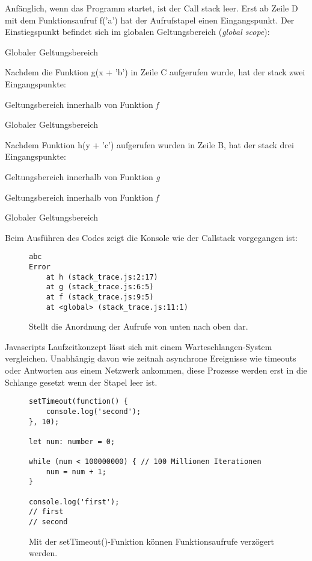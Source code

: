 \noindent
Anfänglich, wenn das Programm startet, ist der Call stack leer. Erst ab Zeile D mit dem Funktionsaufruf f('a') hat der Aufrufstapel einen Eingangspunkt. Der Einstiegspunkt befindet sich im globalen Geltungsbereich (\textit{global scope}):

\begin{description}
\item Globaler Geltungsbereich
\end{description}

\noindent
Nachdem die Funktion g(x + 'b') in Zeile C aufgerufen wurde, hat der stack zwei Eingangspunkte:

\begin{description}
\item Geltungsbereich innerhalb von Funktion \textit{f}
\item Globaler Geltungsbereich
\end{description}

\noindent
Nachdem Funktion h(y + 'c') aufgerufen wurden in Zeile B, hat der stack drei Eingangspunkte:

\begin{description}
\item Geltungsbereich innerhalb von Funktion \textit{g}
\item Geltungsbereich innerhalb von Funktion \textit{f}
\item Globaler Geltungsbereich
\end{description}

\noindent
Beim Ausführen des Codes zeigt die Konsole wie der Callstack vorgegangen ist:

\begin{figure}[H]
\begin{lstlisting}
abc
Error
    at h (stack_trace.js:2:17)
    at g (stack_trace.js:6:5)
    at f (stack_trace.js:9:5)
    at <global> (stack_trace.js:11:1)
\end{lstlisting}
\caption{Stellt die Anordnung der Aufrufe von unten nach oben dar.}
\label{stack-trace-error}
\end{figure}

\noindent
Javascripts Laufzeitkonzept lässt sich mit einem Warteschlangen-System vergleichen. Unabhängig davon wie zeitnah asynchrone Ereignisse wie timeouts oder Antworten aus einem Netzwerk ankommen, diese Prozesse werden erst in die Schlange gesetzt wenn der Stapel leer ist.

\begin{figure}[H]
\begin{lstlisting}[basicstyle=\small]
setTimeout(function() {
    console.log('second');
}, 10);

let num: number = 0;

while (num < 100000000) { // 100 Millionen Iterationen
    num = num + 1;
}

console.log('first');
// first
// second
\end{lstlisting}
\caption{Mit der setTimeout()-Funktion können Funktionsaufrufe verzögert werden.}
\label{First-timeout-example}
\end{figure}

